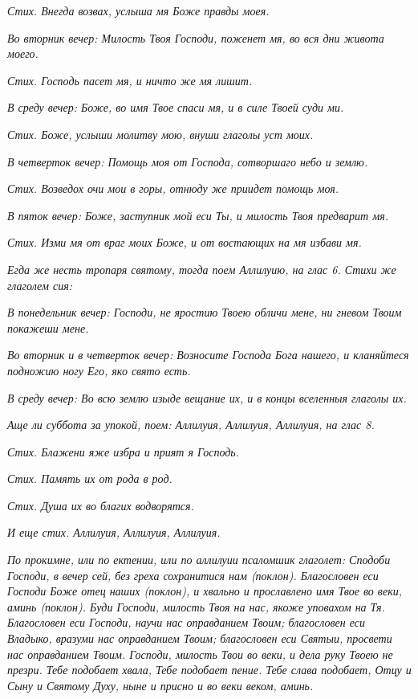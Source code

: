  \itshape Стих.\normalfont{} Внегда возвах, услыша мя Боже правды моея.



 \itshape Во вторник вечер:\normalfont{} Милость Твоя Господи, поженет мя, во вся дни живота
моего.


 \itshape Стих.\normalfont{} Господь пасет мя, и ничто же мя лишит.


 \itshape В среду вечер:\normalfont{} Боже, во имя Твое спаси мя, и в силе Твоей суди
ми.


 \itshape Стих.\normalfont{} Боже, услыши молитву мою, внуши глаголы уст моих.


 \itshape В четверток вечер:\normalfont{} Помощь моя от Господа, сотворшаго небо и
землю.


 \itshape Стих.\normalfont{} Возведох очи мои в горы, отнюду же приидет помощь моя.


 \itshape В пяток вечер:\normalfont{} Боже, заступник мой еси Ты, и милость Твоя предварит
мя.


 \itshape Стих.\normalfont{} Изми мя от враг моих Боже, и от востающих на мя избави
мя.


 \itshape Егда же несть тропаря святому, тогда поем Аллилуию, на глас 6. Стихи
же глаголем сия:\normalfont{}


 \itshape В понедельник вечер:\normalfont{} Господи, не яростию Твоею обличи мене, ни гневом
Твоим покажеши мене.


 \itshape Во вторник и в четверток вечер:\normalfont{} Возносите Господа Бога нашего, и
кланяйтеся подножию ногу Его, яко свято есть.


 \itshape В среду вечер:\normalfont{} Во всю землю изыде вещание их, и в концы вселенныя
глаголы их.


 \itshape Аще ли суббота за упокой, поем:\normalfont{} Аллилуия, Аллилуия, Аллилуия, \itshape на глас
8.\normalfont{}


 \itshape Стих.\normalfont{} Блажени яже избра и прият я Господь.


 \itshape Стих.\normalfont{} Память их от рода в род.


 \itshape Стих.\normalfont{} Душа их во благих водворятся.


 \itshape И еще стих.\normalfont{} Аллилуия, Аллилуия, Аллилуия.


 \itshape По прокимне, или по ектении, или по аллилуии псаломшик глаголет:\normalfont{}
Сподоби Господи, в вечер сей, без греха сохранитися нам \itshape (поклон)\normalfont{}.
Благословен еси Господи Боже отец наших \itshape (поклон)\normalfont{}, и хвально и
прославлено имя Твое во веки, аминь \itshape (поклон)\normalfont{}. Буди Господи, милость Твоя
на нас, якоже уповахом на Тя. Благословен еси Господи, научи нас
оправданием Твоим; благословен еси Владыко, вразуми нас оправданием
Твоим; благословен еси Святыи, просвети нас оправданием Твоим. Господи,
милость Твои во веки, и дела руку Твоею не презри. Тебе подобает хвала,
Тебе подобает пение. Тебе слава подобает, Отцу и Сыну и Святому Духу,
ныне и присно и во веки веком, аминь.


